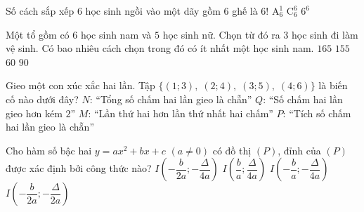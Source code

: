 	\begin{ex}%
		Số cách sắp xếp $6$ học sinh ngồi vào một dãy gồm $6$ ghế là
		\choice
		{\True $6!$}
		{$\mathrm{A}_6^1$}
		{$\mathrm{C}_6^6$}
		{$6^6$}
	\end{ex}

	\begin{ex}%
		Một tổ gồm có $6$ học sinh nam và $5$ học sinh nữ. Chọn từ đó ra $3$ học sinh đi làm vệ sinh. Có bao nhiêu cách chọn trong đó có ít nhất một học sinh nam.
		\choice
		{$165$}
		{\True $155$}
		{$60$}
		{$90$}
	\end{ex}

	\begin{ex}%
		Gieo một con xúc xắc hai lần. Tập $\big\{(1;3),\;(2;4),\;(3;5),\;(4;6)\big\}$ là biến cố nào dưới đây?
		\choice
		{$N$: ``Tổng số chấm hai lần gieo là chẵn''}
		{$Q$: ``Số chấm hai lần gieo hơn kém $2$''}
		{\True $M$: ``Lần thứ hai hơn lần thứ nhất hai chấm''}
		{$P$: ``Tích số chấm hai lần gieo là chẵn''}
	\end{ex}

	\begin{ex}%
		Cho hàm số bậc hai $y=ax^2+bx+c$ $(a \neq 0)$ có đồ thị $(P)$, đỉnh của $(P)$ được xác định bởi công thức nào?
		\choice
		{\True $I\left(-\dfrac{b}{2a};-\dfrac{\Delta}{4a}\right)$}
		{$I\left(\dfrac{b}{a};\dfrac{\Delta}{4a}\right)$}
		{$I\left(-\dfrac{b}{a};-\dfrac{\Delta}{4a}\right)$}
		{$I\left(-\dfrac{b}{2a};-\dfrac{\Delta}{2a}\right)$}
	\end{ex}

